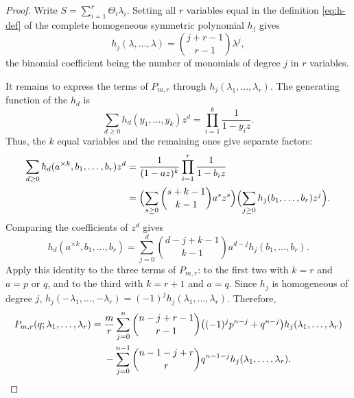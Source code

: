 \documentclass[11pt]{article}
\theoremstyle{remark}
\numberwithin{equation}{section}
\begin{document}
\begin{proof}
  Write $S=\sum_{i=1}^r\Theta_i\lambda_i$.
  Setting all $r$ variables equal in the definition \eqref{eq:h-def}
  of the complete homogeneous symmetric polynomial $h_j$ gives
  \begin{equation}\label{eq:pge23-h-diagonal}
    h_j(\lambda,\ldots,\lambda)=\binom{j+r-1}{r-1}\lambda^j,
  \end{equation}
  the binomial coefficient being the number of monomials of degree $j$ in $r$ variables.

  It remains to express the terms of $P_{m,r}$ through
  $h_j(\lambda_1,\ldots,\lambda_r)$.
  The generating function of the $h_d$ is
  \begin{equation}\label{eq:pge23-h-generating}
    \sum_{d\ge0}h_d(y_1,\ldots,y_k)z^d
    =\prod_{i=1}^k\frac{1}{1-y_iz}.
  \end{equation}
  Thus, the $k$ equal variables and the remaining ones give separate factors:
  \[
    \begin{aligned}
      \sum_{d\ge0}h_d(a^{\times k},b_1,\ldots,b_r)z^d
      &=\frac{1}{(1-az)^k}\prod_{i=1}^r\frac{1}{1-b_iz}\\
      &=\Bigl(\sum_{s\ge0}\binom{s+k-1}{k-1}a^sz^s\Bigr)
        \Bigl(\sum_{j\ge0}h_j(b_1,\ldots,b_r)z^j\Bigr).
    \end{aligned}
  \]
  Comparing the coefficients of $z^d$ gives
  \begin{equation}\label{eq:pge23-h-split}
    h_d(a^{\times k},b_1,\ldots,b_r)
    =\sum_{j=0}^d
    \binom{d-j+k-1}{k-1}a^{d-j}h_j(b_1,\ldots,b_r).
  \end{equation}
  Apply this identity to the three terms of $P_{m,r}$: to the first two
  with $k=r$ and $a=p$ or $q$, and to the third with $k=r+1$ and $a=q$.
  Since $h_j$ is homogeneous of degree $j$,
  $h_j(-\lambda_1,\ldots,-\lambda_r)=(-1)^jh_j(\lambda_1,\ldots,\lambda_r)$.
  Therefore,
  \begin{align}
    P_{m,r}(q;\lambda_1,\ldots,\lambda_r)
    ={}&\frac {m}{r}\sum_{j=0}^{n}\binom{n-j+r-1}{r-1}
    \bigl((-1)^jp^{n-j}+q^{n-j}\bigr)
    h_j(\lambda_1,\ldots,\lambda_r) \notag\\
    &-\sum_{j=0}^{n-1}\binom{n-1-j+r}{r}q^{n-1-j}
    h_j(\lambda_1,\ldots,\lambda_r). \label{eq:pge23-P-in-h}
  \end{align}


\end{proof}
\end{document}

